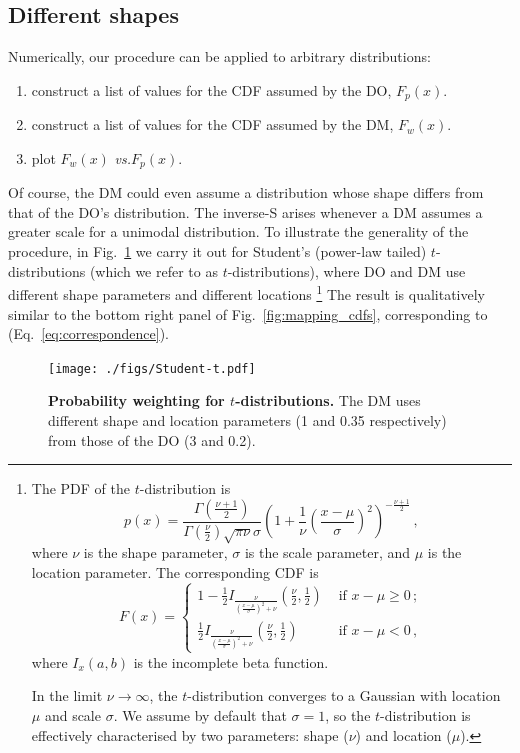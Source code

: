 \documentclass[a4paper, 12pt]{article}
\newcommand{\eref}[1]{(Eq.~\ref{eq:#1})}
\newcommand{\flabel}[1]{\label{fig:#1}}
\newcommand{\fref}[1]{Fig.~\ref{fig:#1}}
\newcommand{\seclabel}[1]{\label{sec:#1}}
\newcommand{\vs}{\textit{vs.}\xspace}
\newcommand{\be}{\begin{equation}}
\newcommand{\ee}{\end{equation}}
\begin{document}
\FloatBarrier

\subsection{Different shapes\seclabel{Different_shapes}}
Numerically, our procedure can be applied to arbitrary distributions:
\begin{enumerate}
\item
construct a list of values for the CDF assumed by the DO, $F_p(x)$.
\item
construct a list of values for the CDF assumed by the DM, $F_w(x)$.
\item
plot $F_w(x)$ \vs $F_p(x)$.
\end{enumerate}
Of course, the DM could even assume a distribution whose shape differs from that of the DO's distribution.
The inverse-S arises whenever a DM assumes a greater scale for a unimodal distribution.
To illustrate the generality of the procedure, in \fref{Student-t} we carry it out for Student's (power-law tailed) $t$-distributions (which we refer to as $t$-distributions), where DO and DM use different shape parameters and different locations
\footnote{
The PDF of the $t$-distribution is
%
\be
p\left(x\right) = \frac{\Gamma\left(\frac{\nu+1}{2}\right)} {\Gamma\left(\frac{\nu}{2}\right)\sqrt{\pi\nu}\sigma} \left(1+\frac{1}{\nu}\left(\frac{x-\mu}{\sigma}\right)^2 \right)^{-\frac{\nu+1}{2}}\,,
\ee
%
where $\nu$ is the shape parameter, $\sigma$ is the scale parameter, and $\mu$ is the location parameter. The corresponding CDF is
%
\be
F\left(x\right) =
\begin{cases}
1 - \frac{1}{2} I_{\frac{\nu}{\left(\frac{x-\mu}{\sigma}\right)^2 + \nu}}\left(\frac{\nu}{2},\frac{1}{2}\right) &\text{ if } x-\mu \geq 0\,;\\
\frac{1}{2} I_{\frac{\nu}{\left(\frac{x-\mu}{\sigma}\right)^2 + \nu}}\left(\frac{\nu}{2},\frac{1}{2}\right) &\text{ if } x-\mu < 0\,,
\end{cases}
\ee
%
where $I_x\left(a,b\right)$ is the incomplete beta function.

In the limit $\nu \rightarrow \infty$, the $t$-distribution converges to a Gaussian with location $\mu$ and scale $\sigma$. We assume by default that $\sigma = 1$, so the $t$-distribution is effectively characterised by two parameters: shape ($\nu$) and location ($\mu$).
}
The result is qualitatively similar to the bottom right panel of \fref{mapping_cdfs}, corresponding to \eref{correspondence}.
\begin{figure}[!htb]
\centering
\texttt{[image: ./figs/Student-t.pdf]}
\caption{\textbf{Probability weighting for $t$-distributions.} The DM uses different shape and location parameters (1 and 0.35 respectively) from those of the DO (3 and 0.2).}
\flabel{Student-t}
\end{figure}
\end{document}
